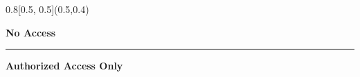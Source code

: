 \documentclass[english,a4paper]{article}
\begin{document}



\setlength{\TPHorizModule}{\paperwidth}
\setlength{\TPVertModule}{\paperheight}
\textblockorigin{0mm}{10mm} %
\setlength{\parindent}{0pt}

\pagestyle{empty}







  \begin{textblock}{0.8}[0.5, 0.5](0.5,0.4)
  \begin{center}
  \fontsize{86}{94}
  \selectfont
  \textbf{No Access}
  \vspace{30mm}
  \hrule
  \vspace{30mm}
  \fontsize{72}{86}
  \selectfont
  \textbf{Authorized Access Only}
  \end{center}


  \end{textblock}

\null\newpage
\end{document}

